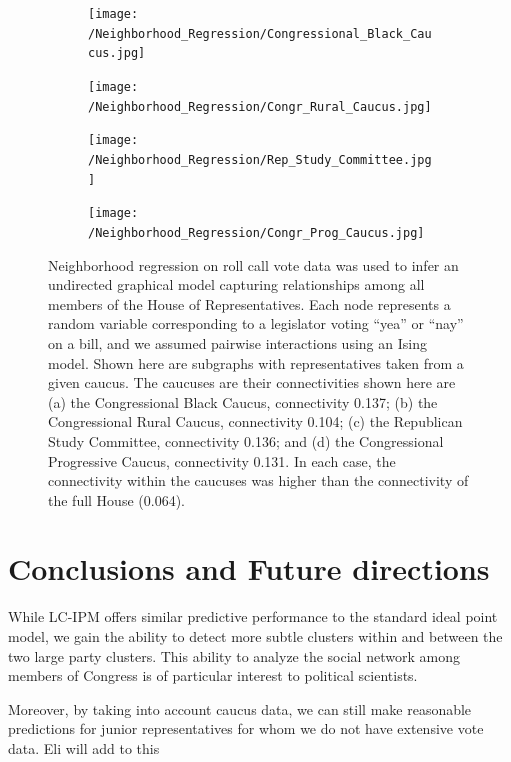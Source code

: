 \documentclass[a4paper]{article}
\begin{document}
\begin{figure}[h]
  \centering
    \begin{subfigure}[b]{0.49\textwidth}
        \texttt{[image: /Neighborhood\_Regression/Congressional\_Black\_Caucus.jpg]}
        \caption{}
    \end{subfigure}
          \begin{subfigure}[b]{0.49\textwidth}
        \texttt{[image: /Neighborhood\_Regression/Congr\_Rural\_Caucus.jpg]}
        \caption{}
    \end{subfigure}
        \begin{subfigure}[b]{0.49\textwidth}
        \texttt{[image: /Neighborhood\_Regression/Rep\_Study\_Committee.jpg]}
        \caption{}
    \end{subfigure}
          \begin{subfigure}[b]{0.49\textwidth}
        \texttt{[image: /Neighborhood\_Regression/Congr\_Prog\_Caucus.jpg]}
        \caption{}
    \end{subfigure}
  \caption{Neighborhood regression on roll call vote data was used to infer an undirected graphical model capturing relationships among all members of the House of Representatives. Each node represents a random variable corresponding to a legislator voting ``yea'' or ``nay'' on a bill, and we assumed pairwise interactions using an Ising model. Shown here are subgraphs with representatives taken from a given caucus. The caucuses are their connectivities shown here are (a) the Congressional Black Caucus, connectivity 0.137; (b) the Congressional Rural Caucus, connectivity 0.104; (c) the Republican Study Committee, connectivity 0.136; and (d) the Congressional Progressive Caucus, connectivity 0.131. In each case, the connectivity within the caucuses was higher than the connectivity of the full House (0.064).}
      \label{fig:Nhood_Caucus}
\end{figure}


\section{Conclusions and Future directions} 
While LC-IPM offers similar predictive performance to the standard ideal point model, we gain the ability to detect more subtle clusters within and between the two large party clusters. This ability to analyze the social network among members of Congress is of particular interest to political scientists. \par

Moreover, by taking into account caucus data, we can still make reasonable predictions for junior representatives for whom we do not have extensive vote data.  {\color{red} Eli will add to this}  \par
\end{document}
